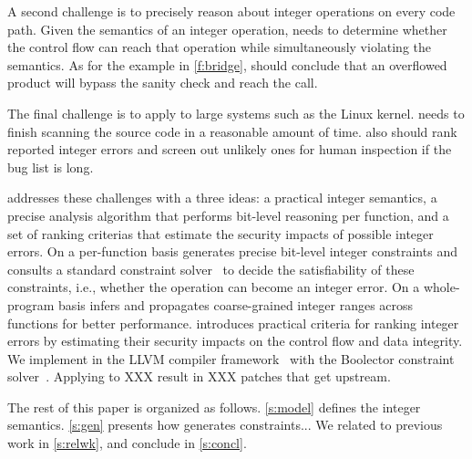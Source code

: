 A second challenge is to precisely reason about integer operations
on every code path.  Given the semantics of an integer operation,
\sys needs to determine whether the control flow can reach that
operation while simultaneously violating the semantics.  As for the
example in \autoref{f:bridge}, \sys should conclude that an overflowed
product  will bypass the sanity check and reach the
 call.

The final challenge is to apply \sys to large systems such as the
Linux kernel.  \sys needs to finish scanning the source code in a
reasonable amount of time.  \sys also should rank reported integer
errors and screen out unlikely ones for human inspection if the bug
list is long.

\sys addresses these challenges with a three ideas: a practical
integer semantics, a precise analysis algorithm that performs
bit-level reasoning per function, and a set of ranking criterias
that estimate the security impacts of possible integer errors.
On a per-function basis \sys generates precise bit-level integer
constraints and consults a standard constraint
solver~\cite{boolector} to decide the satisfiability
of these constraints, i.e., whether the operation can become an
integer error. 
%
On a whole-program basis \sys infers and propagates coarse-grained
integer ranges across functions for better performance.
%
\sys introduces practical criteria for ranking integer
errors by estimating their security impacts on the control flow and
data integrity.
\fi
%
We implement \sys in the LLVM compiler framework~\cite{lattner:llvm}
with the Boolector constraint solver~\cite{boolector}.
Applying \sys to XXX result in XXX patches that get upstream.


The rest of this paper is organized as follows. \autoref{s:model}
defines the integer semantics.  \autoref{s:gen} presents how \sys generates
constraints...  We related \sys to previous work in \autoref{s:relwk},
and conclude in \autoref{s:concl}.
